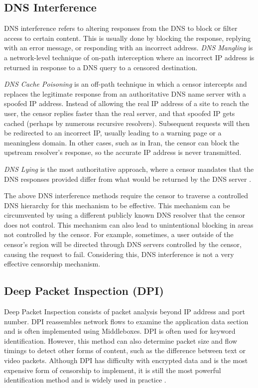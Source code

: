 \subsection{DNS Interference}

DNS interference refers to altering responses from the DNS to block or filter access to certain content. This is usually done by blocking the response, replying with an error message, or responding with an incorrect address. \textit{DNS Mangling} is a network-level technique of on-path interception where an incorrect IP address is returned in response to a DNS query to a censored destination. 

\textit{DNS Cache Poisoning} is an off-path technique in which a censor intercepts and replaces the legitimate response from an authoritative DNS name server with a spoofed IP address. Instead of allowing the real IP address of a site to reach the user, the censor replies faster than the real server, and that spoofed IP gets cached (perhaps by numerous recursive resolvers). Subsequent requests will then be redirected to an incorrect IP, usually leading to a warning page or a meaningless domain. In other cases, such as in Iran, the censor can block the upstream resolver's response, so the accurate IP address is never transmitted.

\textit{DNS Lying} is the most authoritative approach, where a censor mandates that the DNS responses provided differ from what would be returned by the DNS server \cite{rfc9505}.

The above DNS interference methods require the censor to traverse a controlled DNS hierarchy for this mechanism to be effective. This mechanism can be circumvented by using a different publicly known DNS resolver that the censor does not control. This mechanism can also lead to unintentional blocking in areas not controlled by the censor. For example, sometimes, a user outside of the censor's region will be directed through DNS servers controlled by the censor, causing the request to fail. Considering this, DNS interference is not a very effective censorship mechanism.

\subsection{Deep Packet Inspection (DPI)}

Deep Packet Inspection consists of packet analysis beyond IP address and port number. DPI reassembles network flows to examine the application data section and is often implemented using Middleboxes. DPI is often used for keyword identification. However, this method can also determine packet size and flow timings to detect other forms of content, such as the difference between text or video packets. Although DPI has difficulty with encrypted data and is the most expensive form of censorship to implement, it is still the most powerful identification method and is widely used in practice \cite{rfc9505}.

